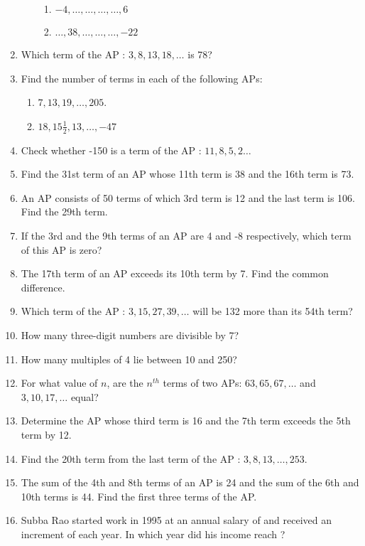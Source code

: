 \begin{enumerate}[label=\thesubsection.\arabic*, ref=\thesubsection.\theenumi]
\begin{enumerate}
\begin{multicols}{2}
\begin{enumerate}
\item $-4,  \dots  ,  \dots  ,  \dots  ,  \dots,  6$
\item $\dots ,  38,  \dots ,  \dots ,  \dots ,  -22$
\end{enumerate}
\end{multicols}
\end{enumerate}
\item Which term of the AP : $3,  8,  13,  18,  \dots $ is 78?
\item Find the number of terms in each of the following APs:
\begin{enumerate}
	\item $7,  13,  19,  \dots , 205$.
	\item $18,  15\frac{1}{2},  13, \dots , -47$
\end{enumerate}
\item Check whether -150 is a term of the AP : $11,  8,  5,  2 \dots $ 
\item Find the 31st term of an AP whose 11th term is 38 and the 16th term is 73.
\item An AP consists of 50 terms of which 3rd term is 12 and the last term is 106. Find the 29th term.
\item If the 3rd and the 9th terms of an AP are 4 and -8 respectively,  which term of this AP is zero?
\item The 17th term of an AP exceeds its 10th term by 7. Find the common difference.
\item Which term of the AP : $3,  15,  27,  39, \dots $  will be 132 more than its 54th term? 
\item How many three-digit numbers are divisible by 7?
\item How many multiples of 4 lie between 10 and 250?
\item For what value of $n$,  are the $n^{th}$ terms of two APs: $63,  65,  67, \dots $  and $3,  10,  17, \dots $  equal?
\item Determine the AP whose third term is 16 and the 7th term exceeds the 5th term by 12.
\item Find the 20th term from the last term of the AP : $3,  8,  13, \dots  ,  253$.
\item The sum of the 4th and 8th terms of an AP is 24 and the sum of the 6th and 10th terms is 44. Find the first three terms of the AP.
\item Subba Rao started work in 1995 at an annual salary of  and received an increment of  each year. In which year did his income reach ?

\end{enumerate}

